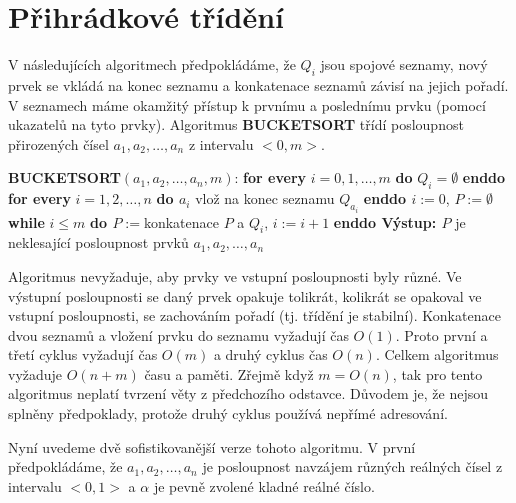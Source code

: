 \documentclass[a4paper,12pt]{article}
\begin{document}
\section{{Přihrádkové třídění}}

V následujících algoritmech 
před\-po\-klá\-dáme, že $Q_i$ jsou spojové seznamy, nový 
prvek se vkládá na konec seznamu a konkatenace 
seznamů závisí na jejich pořadí. V 
seznamech máme okamžitý přístup k prvnímu a poslednímu 
prvku (pomocí ukazatelů na tyto prvky). 
Algoritmus {\bf BUCKETSORT} třídí posloupnost přirozených 
čísel $a_1,a_2,\dots,a_n$ z intervalu $<0,m>$.

{\bf BUCKETSORT$(a_1,a_2,\dots,a_n,m)$}:\newline 
{\bf for every} $i=0,1,\dots,m$ {\bf do} $Q_i=\emptyset$ {\bf enddo\newline 
for every} $i=1,2,\dots,n$ {\bf do\newline 
\phantom{{\rm ---}}$a_i$} vlož na konec seznamu $Q_{a_i}$\newline 
{\bf enddo\newline 
$i:=0$}, $P:=\emptyset$\newline 
{\bf while} $i\le m$ {\bf do\newline 
\phantom{{\rm ---}}$P:=$}konkatenace $P$ a $Q_i$, $i:=i+1$\newline 
{\bf enddo\newline 
Výstup: $P$} je neklesající posloupnost prvků 
$a_1,a_2,\dots,a_n$

Algoritmus nevyžaduje, aby prvky ve 
vstupní posloupnosti by\-ly různé. Ve výstupní 
posloupnosti se daný prvek opakuje tolikrát, kolikrát se 
opakoval ve vstupní posloupnosti, se zachováním pořadí 
(tj. třídění je stabilní). 
Konkatenace dvou seznamů a vložení prvku do seznamu 
vyžadují čas $O(1)$. Proto první a třetí cyklus vyžadují 
čas $O(m)$ a druhý cyklus čas $O(n)$. Celkem 
algoritmus vyžaduje $O(n+m)$ času a paměti. Zřejmě když  
$m=O(n)$, tak pro tento algoritmus neplatí tvrzení věty z 
předchozího odstavce. 
Důvodem je, 
že nejsou splněny předpoklady, protože druhý cyklus 
používá nepřímé adresování.

Nyní uvedeme dvě sofistikovanější verze tohoto 
algoritmu. V první předpokládáme, že 
$a_1,a_2,\dots,a_n$ je posloupnost navzájem různých reálných 
čísel z intervalu $<0,1>$ a $\alpha$ je pevně zvolené kladné 
reálné číslo.
\end{document}
